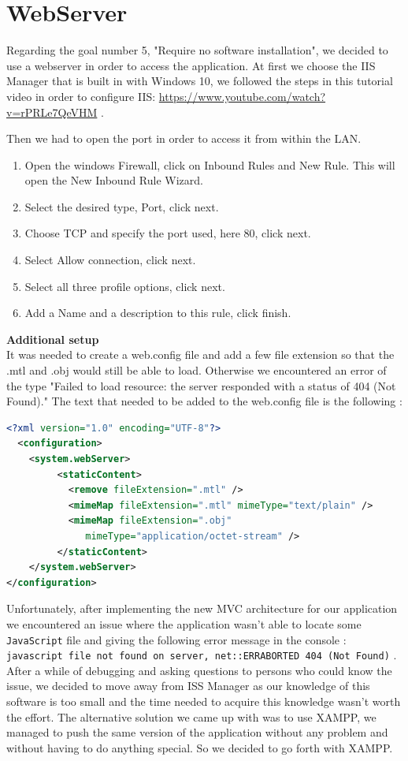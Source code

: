 \documentclass{scrbook}
\begin{document}
\section{WebServer \label{webserver}}
Regarding the goal number 5, "Require no software installation", we decided to use a webserver in order to access the application. At first we choose the IIS Manager that is built in with Windows 10, 
we followed the steps in this tutorial video in order to configure IIS: \url{https://www.youtube.com/watch?v=rPRLe7QeVHM} .

Then we had to open the port in order to access it from within the LAN.
\begin{enumerate}
  \item Open the windows Firewall, click on Inbound Rules and New Rule. This will open the New Inbound Rule Wizard.
  \item Select the desired type, Port, click next.
  \item Choose TCP and specify the port used, here 80, click next.
  \item Select Allow connection, click next.
  \item Select all three profile options, click next.
  \item Add a Name and a description to this rule, click finish.
\end{enumerate}

\textbf{Additional setup}\\

It was needed to create a web.config file and add a few file extension so that the .mtl and .obj would still be able to load. 
Otherwise we encountered an error of the type "Failed to load resource: the server responded with a status of 404 (Not Found)." 
The text that needed to be added to the web.config file is the following : 

\begin{lstlisting}[language=XML, basicstyle=\ttfamily\small]
<?xml version="1.0" encoding="UTF-8"?>
  <configuration>
    <system.webServer>
         <staticContent>
           <remove fileExtension=".mtl" />
           <mimeMap fileExtension=".mtl" mimeType="text/plain" />
           <mimeMap fileExtension=".obj" 
              mimeType="application/octet-stream" />
         </staticContent>
    </system.webServer>
</configuration>
\end{lstlisting}

Unfortunately, after implementing the new MVC architecture for our application we encountered an issue where the application wasn't able to locate some \texttt{JavaScript} file and giving the following error message in the console : 
\texttt{javascript file not found on server, net::ERR\textunderscore ABORTED 404 (Not Found)} .  After a while of debugging and asking questions to persons who could know the issue, 
we decided to move away from ISS Manager as our knowledge of this software is too small and the time needed to acquire this knowledge wasn't worth the effort. 
The alternative solution we came up with was to use XAMPP, we managed to push the same version of the application without any problem and without having to do anything special. So we decided to go forth with XAMPP.
\end{document}
